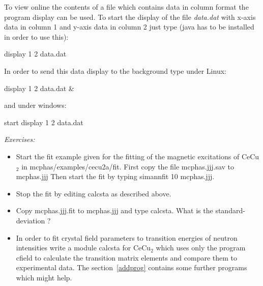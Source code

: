 To view online the contents of a file which contains data in column format
the program {\prg display} can be used. To start the display of
the file {\em data.dat} with x-axis data in column 1 and y-axis data
in column 2 just type (java has to be installed in order to use this):

display 1 2 data.dat

In order to send this data display to the background type under Linux:

display 1 2 data.dat \&

and under windows:

start display 1 2 data.dat


\vspace{1cm}
{\em Exercises:}
\begin{itemize}
\item 
Start the fit example given for the fitting of the magnetic 
excitations of CeCu$_2$ in {\prg mcphas/examples/cecu2a/fit}.
First copy the file {\prg mcphas.jjj.sav} to {\prg mcphas.jjj}
Then start the fit by typing {\prg simannfit 10 mcphas.jjj}.
\item
Stop the fit by editing {\prg calcsta} as described above.
\item 
Copy {\prg mcphas.jjj.fit} to {\prg mcphas.jjj}  and type
{\prg calcsta}. What is the standard-deviation ? 
\item 
In order to fit  crystal field parameters to transition
energies of neutron intensities write a module
{\prg calcsta} for CeCu$_2$ which uses only the program
cfield to calculate the transition matrix elements
and compare them to experimental data.
The section~\ref{addprog} contains some further programs which
might help. 
\end{itemize}
